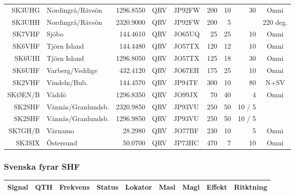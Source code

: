 \begin{landscape}
\begin{longtable}{rlrllrrrc}
SK3UHG  & Nordingrå/Rävsön   & 1296.8550 & QRV & JP92FW & 200 & 10 & 30     & Omni     \\
SK3UHH  & Nordingrå/Rävsön   & 2320.9000 & QRV & JP92FW & 200 & 5  &        & 220 deg. \\
SK7VHF  & Sjöbo              & 144.4610  & QRV & JO65UQ & 25  & 25 & 10     & Omni     \\
SK6VHF  & Tjörn Island       & 144.4480  & QRV & JO57TX & 120 & 12 & 10     & Omni     \\
SK6UHI  & Tjörn Island       & 1296.8050 & QRV & JO57TX & 125 & 18 & 30     & Omni     \\
SK6UHF  & Varberg/Veddige    & 432.4120  & QRV & JO67EH & 175 & 25 & 10     & Omni     \\
SK2VHF  & Vindeln/Bub.       & 144.4570  & QRV & JP94TF & 300 & 10 & 80     & N+SV     \\
SKØEN/B & Väddö              & 1296.8350 & QRV & JO99JX & 70  & 40 & 4      & Omni     \\
SK2SHF  & Vännäs/Granlundsb. & 2320.9850 & QRV & JP93VU & 250 & 50 & 10 / 5 &          \\
SK2SHF  & Vännäs/Granlundsb. & 1296.9850 & QRV & JP93VU & 250 & 50 & 10 / 5 &          \\
SK7GH/B & Värnamo            & 28.2980   & QRV & JO77BF & 230 & 10 & 5      & Omni     \\
SK3SIX  & Östersund          & 50.0700   & QRV & JP73HC & 470 & 7  & 10     & Omni     \\

\end{longtable}

\subsubsection{Svenska fyrar SHF}
\begin{tabular}{rlrllrrrc}

\textbf{Signal} & \textbf{QTH}  & \textbf{Frekvens} & \textbf{Status} & \textbf{Lokator} & 
\textbf{Masl}   & \textbf{Magl} & \textbf{Effekt}   & \textbf{Ritktning} \\ \hline


\end{tabular}
\end{landscape}
